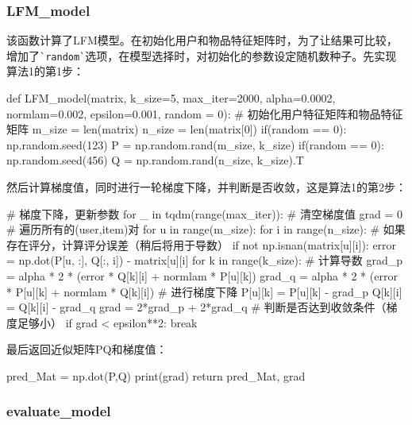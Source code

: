 \documentclass[12pt, a4paper]{ctexart}
\begin{document}
\subsubsection{LFM\_model}

该函数计算了LFM模型。在初始化用户和物品特征矩阵时，为了让结果可比较，增加了\verb|`random`|选项，在模型选择时，对初始化的参数设定随机数种子。先实现算法1的第1步：

\begin{python}
def LFM_model(matrix, k_size=5, max_iter=2000, alpha=0.0002, normlam=0.002, epsilon=0.001, random = 0):
    # 初始化用户特征矩阵和物品特征矩阵
    m_size = len(matrix)
    n_size = len(matrix[0])
    if(random == 0):
      np.random.seed(123)
    P = np.random.rand(m_size, k_size)
    if(random == 0):
      np.random.seed(456)
    Q = np.random.rand(n_size, k_size).T
\end{python}

然后计算梯度值，同时进行一轮梯度下降，并判断是否收敛，这是算法1的第2步：

\begin{python}
    # 梯度下降，更新参数
    for _ in tqdm(range(max_iter)):
        # 清空梯度值
        grad = 0
        # 遍历所有的(user,item)对
        for u in range(m_size):
            for i in range(n_size):
                # 如果存在评分，计算评分误差（稍后将用于导数）
                if not np.isnan(matrix[u][i]):
                    error = np.dot(P[u, :], Q[:, i]) - matrix[u][i]
                    for k in range(k_size):
                        # 计算导数
                        grad_p = alpha * 2 * (error * Q[k][i] + normlam * P[u][k])
                        grad_q = alpha * 2 * (error * P[u][k] + normlam * Q[k][i])
                        # 进行梯度下降
                        P[u][k] = P[u][k] - grad_p
                        Q[k][i] = Q[k][i] - grad_q
                        grad = 2*grad_p + 2*grad_q
        # 判断是否达到收敛条件（梯度足够小）
        if grad < epsilon**2:
            break
\end{python}

最后返回近似矩阵PQ和梯度值：

\begin{python}
    pred_Mat = np.dot(P,Q)
    print(grad)
    return pred_Mat, grad
\end{python}

\subsubsection{evaluate\_model}
\end{document}
